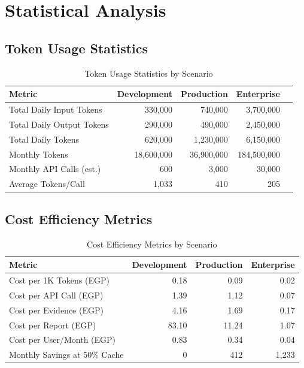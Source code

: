 \documentclass[11pt,a4paper]{article}
\begin{document}
\section{Statistical Analysis}

\subsection{Token Usage Statistics}

\begin{table}[H]
\centering
\begin{tabular}{|l|r|r|r|r|}
\hline
\textbf{Metric} & \textbf{Development} & \textbf{Production} & \textbf{Enterprise} \\
\hline
Total Daily Input Tokens & 330,000 & 740,000 & 3,700,000 \\
\hline
Total Daily Output Tokens & 290,000 & 490,000 & 2,450,000 \\
\hline
Total Daily Tokens & 620,000 & 1,230,000 & 6,150,000 \\
\hline
Monthly Tokens & 18,600,000 & 36,900,000 & 184,500,000 \\
\hline
Monthly API Calls (est.) & 600 & 3,000 & 30,000 \\
\hline
Average Tokens/Call & 1,033 & 410 & 205 \\
\hline
\end{tabular}
\caption{Token Usage Statistics by Scenario}
\end{table}

\subsection{Cost Efficiency Metrics}

\begin{table}[H]
\centering
\begin{tabular}{|l|r|r|r|}
\hline
\textbf{Metric} & \textbf{Development} & \textbf{Production} & \textbf{Enterprise} \\
\hline
Cost per 1K Tokens (EGP) & 0.18 & 0.09 & 0.02 \\
\hline
Cost per API Call (EGP) & 1.39 & 1.12 & 0.07 \\
\hline
Cost per Evidence (EGP) & 4.16 & 1.69 & 0.17 \\
\hline
Cost per Report (EGP) & 83.10 & 11.24 & 1.07 \\
\hline
Cost per User/Month (EGP) & 0.83 & 0.34 & 0.04 \\
\hline
Monthly Savings at 50\% Cache & 0 & 412 & 1,233 \\
\hline
\end{tabular}
\caption{Cost Efficiency Metrics by Scenario}
\end{table}
\end{document}
